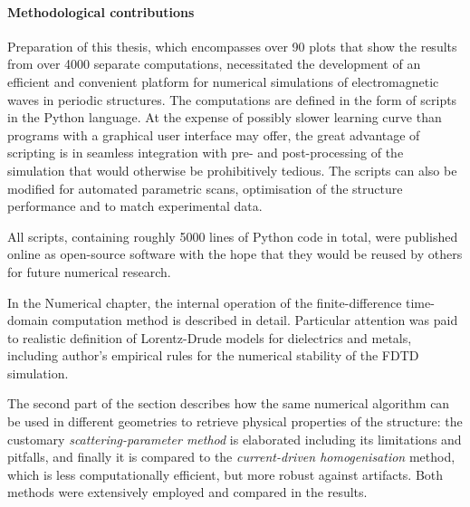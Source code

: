 \paragraph{Methodological contributions}
Preparation of this thesis, which encompasses over 90 plots that show the results from over 4000 separate computations, necessitated the development of an efficient and convenient platform for numerical simulations of electromagnetic waves in periodic structures.
The computations are defined in the form of scripts in the Python language. At the expense of possibly slower learning curve than programs with a graphical user interface may offer, the great advantage of scripting is in seamless integration with pre- and post-processing of the simulation that would otherwise be prohibitively tedious. The scripts can also be modified for automated parametric scans, optimisation of the structure performance and to match experimental data.

All scripts, containing roughly 5000 lines of Python code in total, were published online as open-source software \cite{dominec2014_meep_metamaterials} with the hope that they would be reused by others for future numerical research.

In the Numerical chapter, the internal operation of the finite-difference time-domain computation method is described in detail. Particular attention was paid to realistic definition of Lorentz-Drude models for dielectrics and metals, including author's empirical rules for the numerical stability of the FDTD simulation. 


The second part of the section describes how the same numerical algorithm can be used in different geometries to retrieve physical properties of the structure: the customary \textit{scattering-parameter method} is elaborated including its limitations and pitfalls, and finally it is compared to the \textit{current-driven homogenisation} method, which is less computationally efficient, but more robust against artifacts. Both methods were extensively employed and compared in the results.

